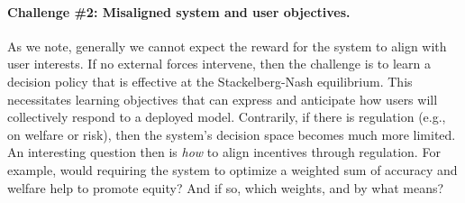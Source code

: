 

\paragraph{Challenge \#2:  Misaligned system and user objectives.}  
As we note, generally we cannot expect the reward for the system to align with user interests.
If no external forces intervene, 
then the challenge is to 
learn a decision policy that is effective at the Stackelberg-Nash equilibrium.
This necessitates learning objectives that can express and anticipate
how users will collectively respond to a deployed model.
Contrarily, if there is regulation (e.g., on welfare or risk),
then the system's decision space becomes much more limited.
An interesting question then is \emph{how} to align incentives through regulation.
For example, would requiring the system to optimize a weighted sum of accuracy and welfare help to promote equity? And if so, which weights, and by what means?
\squeeze


